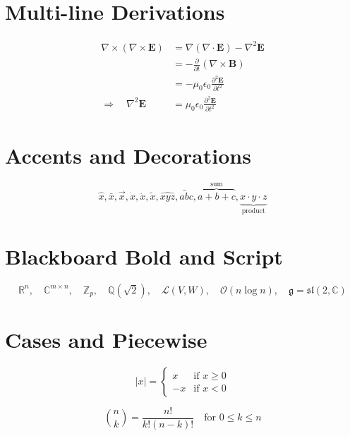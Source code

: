 \documentclass{article}
\begin{document}
\section{Multi-line Derivations}

\begin{align}
    \nabla \times (\nabla \times \mathbf{E})
        &= \nabla(\nabla \cdot \mathbf{E}) - \nabla^2 \mathbf{E} \\
        &= -\frac{\partial}{\partial t}(\nabla \times \mathbf{B}) \\
        &= -\mu_0 \epsilon_0 \frac{\partial^2 \mathbf{E}}{\partial t^2} \\
    \Rightarrow \quad \nabla^2 \mathbf{E}
        &= \mu_0 \epsilon_0 \frac{\partial^2 \mathbf{E}}{\partial t^2}
\end{align}

\section{Accents and Decorations}

\begin{equation}
    \hat{x}, \bar{x}, \vec{x}, \dot{x}, \ddot{x},
    \tilde{x}, \widehat{xyz}, \widetilde{abc},
    \overbrace{a+b+c}^{\text{sum}},
    \underbrace{x \cdot y \cdot z}_{\text{product}}
\end{equation}

\section{Blackboard Bold and Script}

\begin{equation}
    \mathbb{R}^n, \quad \mathbb{C}^{m \times n}, \quad
    \mathbb{Z}_p, \quad \mathbb{Q}(\sqrt{2}), \quad
    \mathscr{L}(V, W), \quad \mathcal{O}(n \log n), \quad
    \mathfrak{g} = \mathfrak{sl}(2, \mathbb{C})
\end{equation}

\section{Cases and Piecewise}

\begin{equation}
    |x| = \begin{cases}
        x & \text{if } x \geq 0 \\
        -x & \text{if } x < 0
    \end{cases}
\end{equation}

\begin{equation}
    \binom{n}{k} = \frac{n!}{k!(n-k)!} \quad \text{for } 0 \leq k \leq n
\end{equation}
\end{document}
